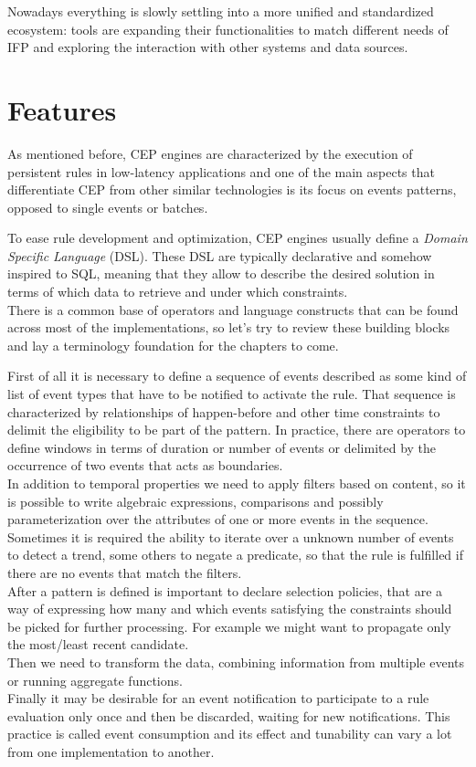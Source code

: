 Nowadays everything is slowly settling into a more unified and standardized ecosystem: tools are expanding their functionalities to match different needs of IFP and exploring the interaction with other systems and data sources.

\section{Features}
As mentioned before, CEP engines are characterized by the execution of persistent rules in low-latency applications and one of the main aspects that differentiate CEP from other similar technologies is its focus on events patterns, opposed to single events or batches.

To ease rule development and optimization, CEP engines usually define a \emph{Domain Specific Language} (DSL). These DSL are typically declarative and somehow inspired to SQL, meaning that they allow to describe the desired solution in terms of which data to retrieve and under which constraints.\\
There is a common base of operators and language constructs that can be found across most of the implementations, so let's try to review these building blocks and lay a terminology foundation for the chapters to come.

First of all it is necessary to define a sequence of events described as some kind of list of event types that have to be notified to activate the rule. That sequence is characterized by relationships of happen-before and other time constraints to delimit the eligibility to be part of the pattern. In practice, there are operators to define windows in terms of duration or number of events or delimited by the occurrence of two events that acts as boundaries.\\
In addition to temporal properties we need to apply filters based on content, so it is possible to write algebraic expressions, comparisons and possibly parameterization over the attributes of one or more events in the sequence.\\
Sometimes it is required the ability to iterate over a unknown number of events to detect a trend, some others to negate a predicate, so that the rule is fulfilled if there are no events that match the filters.\\
After a pattern is defined is important to declare selection policies, that are a way of expressing how many and which events satisfying the constraints should be picked for further processing. For example we might want to propagate only the most/least recent candidate.\\
Then we need to transform the data, combining information from multiple events or running aggregate functions.\\
Finally it may be desirable for an event notification to participate to a rule evaluation only once and then be discarded, waiting for new notifications. This practice is called event consumption and its effect and tunability can vary a lot from one implementation to another.

